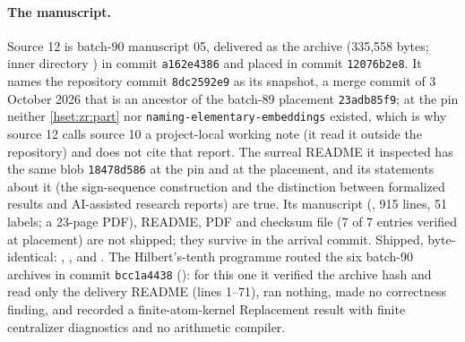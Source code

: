 \documentclass[11pt,letterpaper]{article}
\theoremstyle{definition}
\theoremstyle{remark}
\newcommand{\repo}[1]{\nolinkurl{#1}}
\begin{document}
\paragraph{The manuscript.} Source 12 is batch-90 manuscript 05, delivered as
the archive  (335,558 bytes; inner
directory ) in commit \texttt{a162e4386} and
placed in commit \texttt{12076b2e8}. It names the repository commit
\texttt{8dc2592e9} as its snapshot, a merge commit of 3 October 2026 that is an
ancestor of the batch-89 placement \texttt{23adb85f9}; at the pin neither
\cref{hset:zr:part} nor \repo{naming-elementary-embeddings} existed, which is
why source 12 calls source 10 a project-local working note (it read it
outside the repository) and does not cite that report. The surreal README it
inspected has the same blob \texttt{18478d586} at the pin and at the placement,
and its statements about it (the sign-sequence construction and the distinction
between formalized results and AI-assisted research reports) are true. Its
manuscript (, 915 lines, 51 labels; a 23-page PDF), README, PDF
and checksum file  (7 of 7 entries verified at placement)
are not shipped; they survive in the arrival commit. Shipped, byte-identical:
,
,
 and
. The Hilbert's-tenth
programme routed the six batch-90 archives in commit \texttt{bcc1a4438}
():
for this one it verified the archive hash and read only the delivery README
(lines 1--71), ran nothing, made no correctness finding, and recorded a
finite-atom-kernel Replacement result with finite centralizer diagnostics and
no arithmetic compiler.
\end{document}
